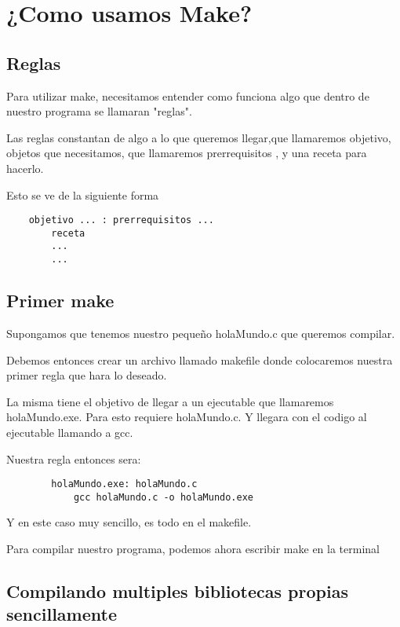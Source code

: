 \documentclass[]{article}
\begin{document}
\section{}

\section{¿Como usamos Make?}
	\subsection{Reglas}
	Para utilizar make, necesitamos entender como funciona algo que dentro de nuestro programa se llamaran "reglas".
	
	Las reglas constantan de algo a lo que queremos llegar,que llamaremos objetivo, objetos que necesitamos, que llamaremos prerrequisitos , y una receta para hacerlo.
	
	Esto se ve de la siguiente forma
	\begin{lstlisting}
	objetivo ... : prerrequisitos ...
		receta
		...
		...
	\end{lstlisting}
	
	\subsection{Primer make}
		Supongamos que tenemos nuestro pequeño holaMundo.c que queremos compilar.
		
		Debemos entonces crear un archivo llamado makefile donde colocaremos nuestra primer regla que hara lo deseado.
		
		La misma tiene el objetivo de llegar a un ejecutable que llamaremos holaMundo.exe. Para esto requiere holaMundo.c. Y llegara con el codigo al ejecutable llamando a gcc.
		
		Nuestra regla entonces sera:
		
		\begin{lstlisting}
		holaMundo.exe: holaMundo.c
			gcc holaMundo.c -o holaMundo.exe
		\end{lstlisting}
		
		Y en este caso muy sencillo, es todo en el makefile.
		
		Para compilar nuestro programa, podemos ahora escribir make en la terminal
	
	
	\subsection{Compilando multiples bibliotecas propias sencillamente}
	
\end{document}
